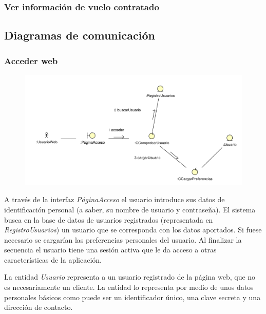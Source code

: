 \documentclass[11pt, a4paper, twoside, titlepage]{article}
\begin{document}
			\subsubsection{Ver información de vuelo contratado}
				\begin{figure}[H]\centering
				\end{figure}


		\subsection{Diagramas de comunicación}

			\subsubsection{Acceder web}
				\begin{figure}[H]\centering
					\includegraphics[scale=.75]{diagramas/accederweb.pdf}
				\end{figure}

				A través de la interfaz {\itshape PáginaAcceso} el usuario introduce sus datos de identificación personal (a saber, su nombre de usuario y contraseña). El sistema busca en la base de datos de usuarios registrados (representada en {\itshape RegistroUsuarios}) un usuario que se corresponda con los datos aportados. Si fuese necesario se cargarían las preferencias personales del usuario. Al finalizar la secuencia el usuario tiene una sesión activa que le da acceso a otras características de la aplicación.

				La entidad {\itshape Usuario} representa a un usuario registrado de la página web, que no es necesariamente un cliente. La entidad lo representa por medio de unos datos personales básicos como puede ser un identificador único, una clave secreta y una dirección de contacto.
\end{document}
